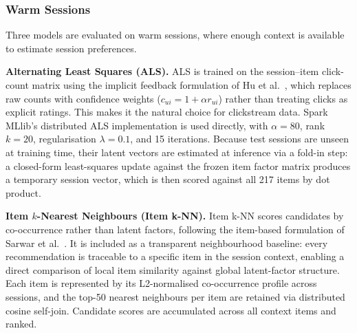 \documentclass[a4paper,oneside,12pt]{book}
\begin{document}
\subsubsection{Warm Sessions}

Three models are evaluated on warm sessions, where enough context is
available to estimate session preferences.

\textbf{Alternating Least Squares (ALS).}
ALS is trained on the session--item click-count matrix using the implicit
feedback formulation of Hu et al.~\cite{hu2008collaborative}, which
replaces raw counts with confidence weights ($c_{ui} = 1 + \alpha r_{ui}$)
rather than treating clicks as explicit ratings.
This makes it the natural choice for clickstream data.
Spark MLlib's distributed ALS implementation is used directly, with
$\alpha = 80$, rank $k = 20$, regularisation $\lambda = 0.1$, and 15
iterations.
Because test sessions are unseen at training time, their latent vectors are
estimated at inference via a fold-in step: a closed-form least-squares
update against the frozen item factor matrix produces a temporary session
vector, which is then scored against all 217 items by dot product.

\textbf{Item $k$-Nearest Neighbours (Item k-NN).}
Item k-NN scores candidates by co-occurrence rather than latent factors,
following the item-based formulation of Sarwar et al.~\cite{sarwar2001item}.
It is included as a transparent neighbourhood baseline: every
recommendation is traceable to a specific item in the session context,
enabling a direct comparison of local item similarity against global
latent-factor structure. Each item is represented by its L2-normalised co-occurrence profile across sessions, and the top-50 nearest neighbours per item are retained via
distributed cosine self-join. Candidate scores are accumulated across all context items and ranked.

\end{document}
